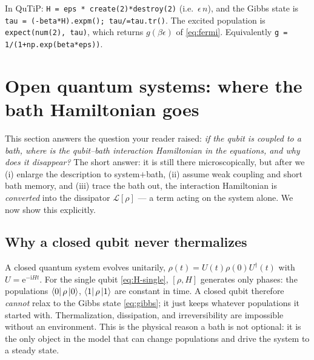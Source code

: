 \documentclass[11pt,a4paper]{article}
\newcommand{\ee}{\mathrm{e}}
\newcommand{\ii}{\mathrm{i}}
\newcommand{\calL}{\mathcal{L}}
\theoremstyle{definition}
\theoremstyle{remark}
\begin{document}
\begin{implbox}
In QuTiP: \texttt{H = eps * create(2)*destroy(2)} (i.e.\ $\epsilon\,n$),
and the Gibbs state is \texttt{tau = (-beta*H).expm(); tau/=tau.tr()}.
The excited population is \texttt{expect(num(2), tau)}, which returns
$g(\beta\epsilon)$ of \eqref{eq:fermi}. Equivalently
\texttt{g = 1/(1+np.exp(beta*eps))}.
\end{implbox}

\section{Open quantum systems: where the bath Hamiltonian goes}
\label{sec:open}

This section answers the question your reader raised: \emph{if the qubit
is coupled to a bath, where is the qubit--bath interaction Hamiltonian in
the equations, and why does it disappear?} The short answer: it is still
there microscopically, but after we (i) enlarge the description to
system$+$bath, (ii) assume weak coupling and short bath memory, and
(iii) trace the bath out, the interaction Hamiltonian is \emph{converted}
into the dissipator $\calL[\rho]$ --- a term acting on the system alone.
We now show this explicitly.

\subsection{Why a closed qubit never thermalizes}
A closed quantum system evolves unitarily, $\rho(t) = U(t)\rho(0)
U^\dagger(t)$ with $U=\ee^{-\ii Ht}$. For the single qubit
\eqref{eq:H-single}, $[\rho,H]$ generates only phases: the populations
$\bra{0}\rho\ket{0}$, $\bra{1}\rho\ket{1}$ are constant in time.
A closed qubit therefore \emph{cannot} relax to the Gibbs state
\eqref{eq:gibbs}; it just keeps whatever populations it started with.
Thermalization, dissipation, and irreversibility are impossible without
an environment. This is the physical reason a bath is not optional: it
is the only object in the model that can change populations and drive
the system to a steady state.
\end{document}
